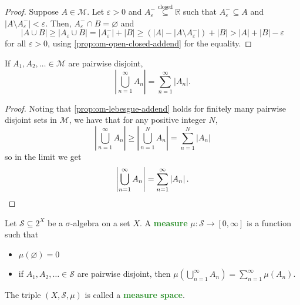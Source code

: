 \documentclass[11pt]{scrartcl}
\providecommand{\eps}{\varepsilon}
\providecommand{\RR}{\mathbb R}
\providecommand{\ii}{\item}
\providecommand{\vocab}[1]{{\textbf{\textcolor{ForestGreen}{#1}}}}
\providecommand{\abs}[1]{\left\lvert #1\right\rvert}
\begin{document}
\begin{proof}
    Suppose $A\in\mathcal M$. Let $\eps>0$ and
    $A_\eps^-\overset{\text{closed}}\subseteq\RR$ such that
    $A_\eps^-\subseteq A$ and $\abs{A\setminus A_\eps^-} < \eps$.
    Then, $A_\eps^-\cap B = \varnothing$ and
    \begin{equation*}
	\abs{A\cup B}\ge \abs{A_\eps\cup B} =
	\abs{A_\eps^-} + \abs B \ge
	(\abs A - \abs{A\setminus A_\eps^-}) + \abs B
	> \abs A + \abs B - \eps
    \end{equation*}
    for all $\eps>0$,
    using \autoref{prop:om-open-closed-addend} for the equality.
\end{proof}

\begin{corollary}
    \label{coro:lebesgue-countable-additivity}
    If $A_1,A_2,\ldots\in\mathcal M$ are pairwise disjoint,
    \begin{equation*}
	\abs{\bigcup_{n=1}^\infty A_n} = \sum_{n=1}^\infty \abs{A_n}.
    \end{equation*}
\end{corollary}

\begin{proof}
    Noting that \autoref{prop:om-lebesgue-addend} holds
    for finitely many pairwise disjoint sets in $\mathcal M$,
    we have that for any positive integer $N$,
    \begin{equation*}
	\abs{\bigcup_{n=1}^\infty A_n} \ge
	\abs{\bigcup_{n=1}^N A_n} =
	\sum_{n=1}^N \abs{A_n}
    \end{equation*}
    so in the limit we get
    \begin{equation*}
	\abs{\bigcup_{n=1}^\infty A_n} = \sum_{n=1}^\infty \abs{A_n}.\qedhere
    \end{equation*}
\end{proof}

\begin{definition}[Measure]
    \label{def:measure}
    Let $\mathcal S\subseteq 2^X$ be a $\sigma$-algebra on a set $X$.
    A \vocab{measure} $\mu\colon\mathcal S\to[0,\infty]$
    is a function such that
    \begin{itemize}
        \ii $\mu(\varnothing) = 0$
	\ii if $A_1,A_2,\ldots\in\mathcal S$ are pairwise disjoint,
	then $\mu(\bigcup_{n=1}^\infty A_n) = \sum_{n=1}^\infty \mu(A_n)$.
    \end{itemize}
    The triple $(X,\mathcal S, \mu)$ is called a \vocab{measure space}.
\end{definition}
\end{document}
